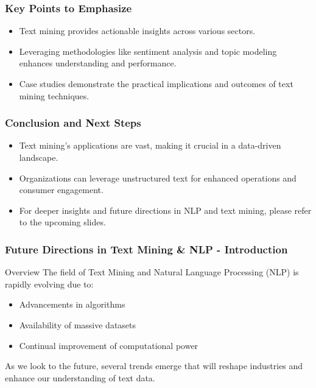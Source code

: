 \documentclass[aspectratio=169]{beamer}
\begin{document}
\begin{frame}[fragile]
  \frametitle{Key Points to Emphasize}
  \begin{itemize}
    \item Text mining provides actionable insights across various sectors.
    \item Leveraging methodologies like sentiment analysis and topic modeling enhances understanding and performance.
    \item Case studies demonstrate the practical implications and outcomes of text mining techniques.
  \end{itemize}
\end{frame}

\begin{frame}[fragile]
  \frametitle{Conclusion and Next Steps}
  \begin{itemize}
    \item Text mining's applications are vast, making it crucial in a data-driven landscape.
    \item Organizations can leverage unstructured text for enhanced operations and consumer engagement.
    \item For deeper insights and future directions in NLP and text mining, please refer to the upcoming slides.
  \end{itemize}
\end{frame}

\begin{frame}[fragile]
    \frametitle{Future Directions in Text Mining \& NLP - Introduction}
    \begin{block}{Overview}
        The field of Text Mining and Natural Language Processing (NLP) is rapidly evolving due to:
    \end{block}
    \begin{itemize}
        \item Advancements in algorithms
        \item Availability of massive datasets
        \item Continual improvement of computational power
    \end{itemize}
    As we look to the future, several trends emerge that will reshape industries and enhance our understanding of text data.
\end{frame}
\end{document}

